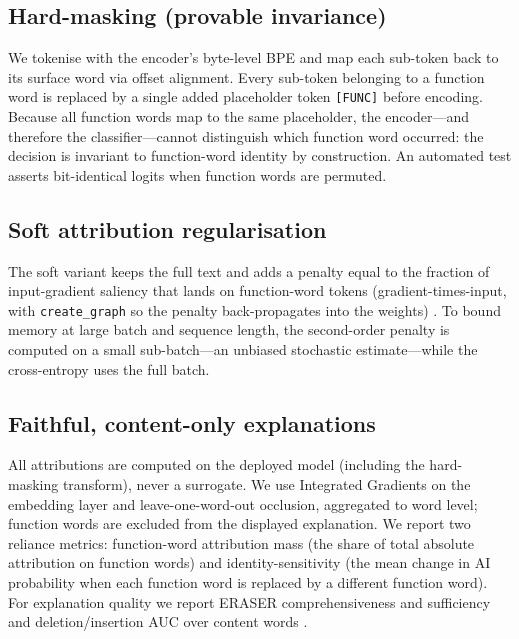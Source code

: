 \documentclass[11pt]{article}
\begin{document}
\subsection{Hard-masking (provable invariance)}
We tokenise with the encoder's byte-level BPE and map each sub-token back to its surface word via offset alignment. Every sub-token belonging to a function word is replaced by a single added placeholder token \texttt{[FUNC]} before encoding. Because all function words map to the same placeholder, the encoder---and therefore the classifier---cannot distinguish which function word occurred: the decision is invariant to function-word identity by construction. An automated test asserts bit-identical logits when function words are permuted.
\subsection{Soft attribution regularisation}
The soft variant keeps the full text and adds a penalty equal to the fraction of input-gradient saliency that lands on function-word tokens (gradient-times-input, with \texttt{create\_graph} so the penalty back-propagates into the weights) \cite{ross}. To bound memory at large batch and sequence length, the second-order penalty is computed on a small sub-batch---an unbiased stochastic estimate---while the cross-entropy uses the full batch.
\subsection{Faithful, content-only explanations}
All attributions are computed on the deployed model (including the hard-masking transform), never a surrogate. We use Integrated Gradients on the embedding layer \cite{ig} and leave-one-word-out occlusion, aggregated to word level; function words are excluded from the displayed explanation. We report two reliance metrics: function-word attribution mass (the share of total absolute attribution on function words) and identity-sensitivity (the mean change in AI probability when each function word is replaced by a different function word). For explanation quality we report ERASER comprehensiveness and sufficiency \cite{eraser} and deletion/insertion AUC over content words \cite{rise}.
\end{document}
